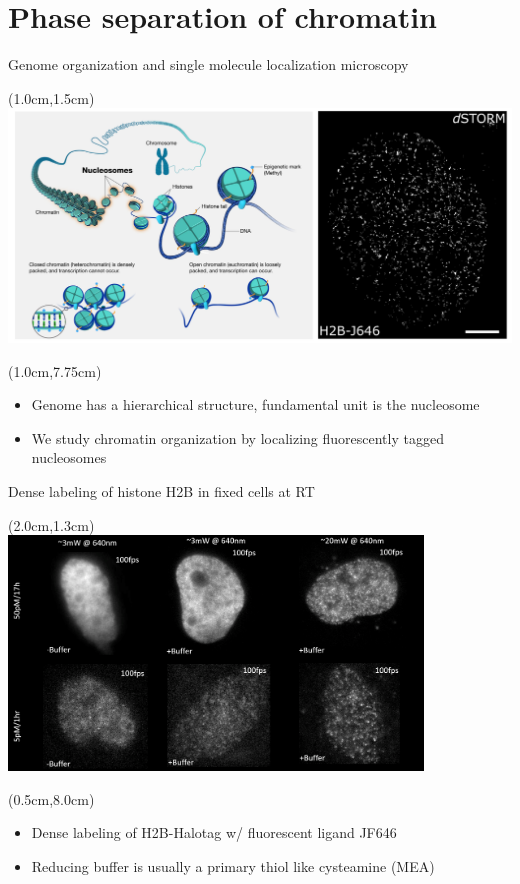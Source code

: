 \documentclass{beamer}					%
\begin{document}
\section{Phase separation of chromatin}

\begin{frame}{Genome organization and single molecule localization microscopy}
\begin{textblock*}{13cm}(1.0cm,1.5cm)
\includegraphics[width=\textwidth]{Intro2}
\end{textblock*}
\begin{textblock*}{\textwidth}(1.0cm,7.75cm)
\begin{itemize}
\item Genome has a hierarchical structure, fundamental unit is the nucleosome
\item We study chromatin organization by localizing fluorescently tagged nucleosomes
\end{itemize}
\end{textblock*}

\end{frame}

\begin{frame}{Dense labeling of histone H2B in fixed cells at RT}
\begin{textblock*}{11cm}(2.0cm,1.3cm)
\includegraphics[width=11cm]{Laser.png}
\end{textblock*}
\begin{textblock*}{\textwidth}(0.5cm,8.0cm)
\begin{itemize}
\item Dense labeling of H2B-Halotag w/ fluorescent ligand JF646
\item Reducing buffer is usually a primary thiol like cysteamine (MEA)
\end{itemize}
\end{textblock*}
\end{frame}
\end{document}
